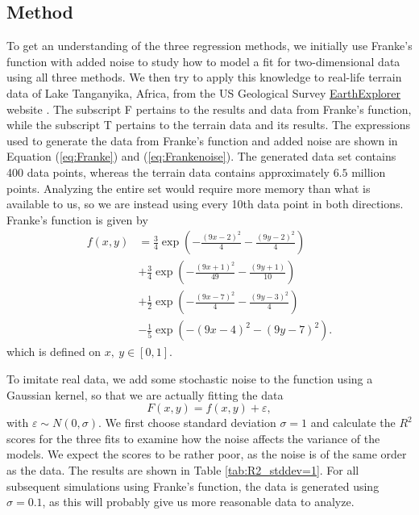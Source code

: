 \documentclass[a4paper, 10pt]{article}
\begin{document}
\begin{multicols}{2}
\section{Method}
To get an understanding of the three regression methods, we initially use Franke's function with added noise to study how to model a fit for two-dimensional data using all three methods. We then try to apply this knowledge to real-life terrain data of Lake Tanganyika, Africa, from the US Geological Survey \href{https://earthexplorer.usgs.gov/}{EarthExplorer}  website \cite{earthexplorer} .  The subscript F pertains to the results and data from Franke's function, while the subscript T pertains to the terrain data and its results.  The expressions used to generate the data from Franke's function and added noise are shown in Equation (\ref{eq:Franke}) and (\ref{eq:Frankenoise}). The generated data set contains 400 data points, whereas the terrain data contains approximately $6.5$ million points. Analyzing the entire set would require more memory than what is available to us, so we are instead using every 10th data point in both directions.
Franke's function is given by
\begin{align}
f(x,y) &= \frac{3}{4}\exp{\left(-\frac{(9x-2)^2}{4}   - \frac{(9y-2)^2}{4}\right)} \nonumber\\
 &+\frac{3}{4}\exp{\left(-\frac{(9x+1)^2}{49}- \frac{(9y+1)}{10}\right)} \nonumber\\
 &+\frac{1}{2}\exp{\left(-\frac{(9x-7)^2}{4} - \frac{(9y-3)^2}{4}\right)} \nonumber\\
 &-\frac{1}{5}\exp{\left(-(9x-4)^2 - (9y-7)^2\right) }. \label{eq:Franke}
\end{align} which is defined on $x,\ y \in [0,1]$.

To imitate real data, we add some stochastic noise to the function using a Gaussian kernel, so that we are actually fitting the data 
\begin{equation}
F(x, y) = f(x, y) + \varepsilon \label{eq:Frankenoise},
\end{equation}
with $ \varepsilon \sim N(0, \sigma) $. We first choose standard deviation $\sigma=1$ and calculate the $R^2$ scores for the three fits to examine how the noise affects the variance of the models. We expect the scores to be rather poor, as the noise is of the same order as the data.  The results are shown in Table \ref{tab:R2_stddev=1}. For all subsequent simulations using Franke's function, the data is generated using $\sigma=0.1$, as this will probably give us more reasonable data to analyze. 


\end{multicols}
\end{document}
